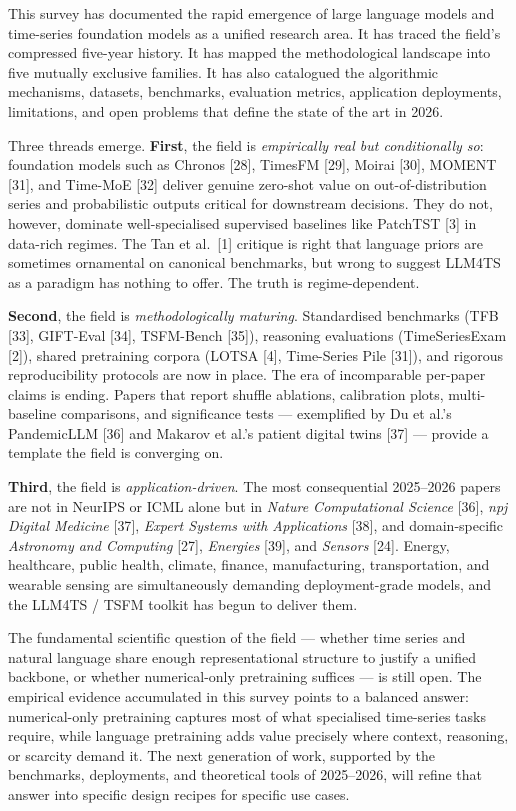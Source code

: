 \documentclass{article}
\begin{document}
This survey has documented the rapid emergence of large language models and time-series foundation models as a unified research area. It has traced the field's compressed five-year history. It has mapped the methodological landscape into five mutually exclusive families. It has also catalogued the algorithmic mechanisms, datasets, benchmarks, evaluation metrics, application deployments, limitations, and open problems that define the state of the art in 2026.

Three threads emerge. \textbf{First}, the field is \emph{empirically real but conditionally so}: foundation models such as Chronos {[}28{]}, TimesFM {[}29{]}, Moirai {[}30{]}, MOMENT {[}31{]}, and Time-MoE {[}32{]} deliver genuine zero-shot value on out-of-distribution series and probabilistic outputs critical for downstream decisions. They do not, however, dominate well-specialised supervised baselines like PatchTST {[}3{]} in data-rich regimes. The Tan et al.~{[}1{]} critique is right that language priors are sometimes ornamental on canonical benchmarks, but wrong to suggest LLM4TS as a paradigm has nothing to offer. The truth is regime-dependent.

\textbf{Second}, the field is \emph{methodologically maturing}. Standardised benchmarks (TFB {[}33{]}, GIFT-Eval {[}34{]}, TSFM-Bench {[}35{]}), reasoning evaluations (TimeSeriesExam {[}2{]}), shared pretraining corpora (LOTSA {[}4{]}, Time-Series Pile {[}31{]}), and rigorous reproducibility protocols are now in place. The era of incomparable per-paper claims is ending. Papers that report shuffle ablations, calibration plots, multi-baseline comparisons, and significance tests --- exemplified by Du et al.'s PandemicLLM {[}36{]} and Makarov et al.'s patient digital twins {[}37{]} --- provide a template the field is converging on.

\textbf{Third}, the field is \emph{application-driven}. The most consequential 2025--2026 papers are not in NeurIPS or ICML alone but in \emph{Nature Computational Science} {[}36{]}, \emph{npj Digital Medicine} {[}37{]}, \emph{Expert Systems with Applications} {[}38{]}, and domain-specific \emph{Astronomy and Computing} {[}27{]}, \emph{Energies} {[}39{]}, and \emph{Sensors} {[}24{]}. Energy, healthcare, public health, climate, finance, manufacturing, transportation, and wearable sensing are simultaneously demanding deployment-grade models, and the LLM4TS / TSFM toolkit has begun to deliver them.

The fundamental scientific question of the field --- whether time series and natural language share enough representational structure to justify a unified backbone, or whether numerical-only pretraining suffices --- is still open. The empirical evidence accumulated in this survey points to a balanced answer: numerical-only pretraining captures most of what specialised time-series tasks require, while language pretraining adds value precisely where context, reasoning, or scarcity demand it. The next generation of work, supported by the benchmarks, deployments, and theoretical tools of 2025--2026, will refine that answer into specific design recipes for specific use cases.
\end{document}

